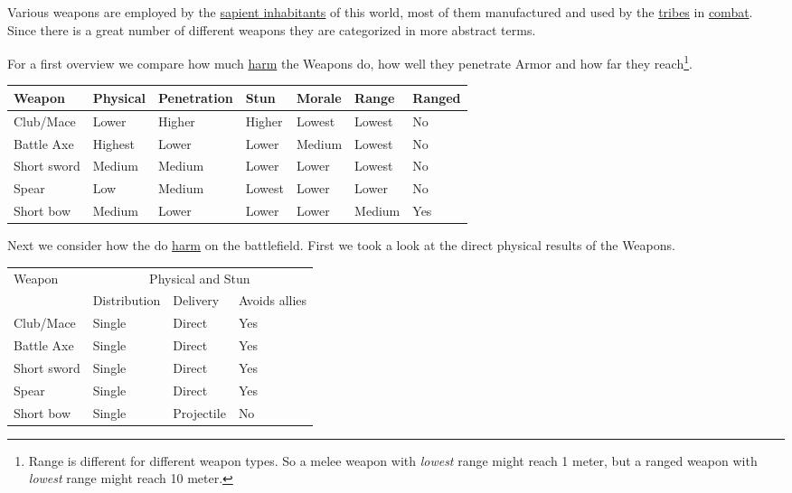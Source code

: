 Various weapons are employed by the
\hyperref[ch:World:Inhabitants:Sapients]{sapient inhabitants} of this world,
most of them manufactured and used by the \hyperref[ch:Tribes]{tribes} in
\hyperref[chch:Conflict:Combat]{combat}. Since there is a great number of
different weapons they are categorized in more abstract terms.

For a first overview we compare how much \hyperref[ch:Conflict:Combat]{harm}
the \glspl{Weapon} do, how well they penetrate \gls{Armor} and how far they
reach\footnote{ Range is different for different weapon types. So a melee
	weapon with \emph{lowest} range might reach 1 meter, but a ranged weapon with
	\emph{lowest} range might reach 10 meter. }.

\begin{longtable}{lllllll}
	\toprule
	Weapon
	 & Physical & Penetration
	 & Stun     & Morale
	 & Range    & Ranged      \\
	\midrule
	Club/Mace
	 & Lower    & Higher
	 & Higher   & Lowest
	 & Lowest   & No          \\
	Battle Axe
	 & Highest  & Lower
	 & Lower    & Medium
	 & Lowest   & No          \\
	Short sword
	 & Medium   & Medium
	 & Lower    & Lower
	 & Lowest   & No          \\
	Spear
	 & Low      & Medium
	 & Lowest   & Lower
	 & Lower    & No          \\
	Short bow
	 & Medium   & Lower
	 & Lower    & Lower
	 & Medium   & Yes         \\
	\bottomrule
\end{longtable}

Next we consider how the do \hyperref[ch:Conflict:Combat]{harm} on the
battlefield. First we took a look at the direct physical results of the
\glspl{Weapon}.

\begin{longtable}{llll}
	\toprule
	Weapon
	 & \multicolumn{3}{c}{Physical and Stun}                              \\
	 & Distribution                          & Delivery   & Avoids allies \\
	\midrule
	Club/Mace
	 & Single                                & Direct     & Yes           \\
	Battle Axe
	 & Single                                & Direct     & Yes           \\
	Short sword
	 & Single                                & Direct     & Yes           \\
	Spear
	 & Single                                & Direct     & Yes           \\
	Short bow
	 & Single                                & Projectile & No            \\
	\bottomrule
\end{longtable}

